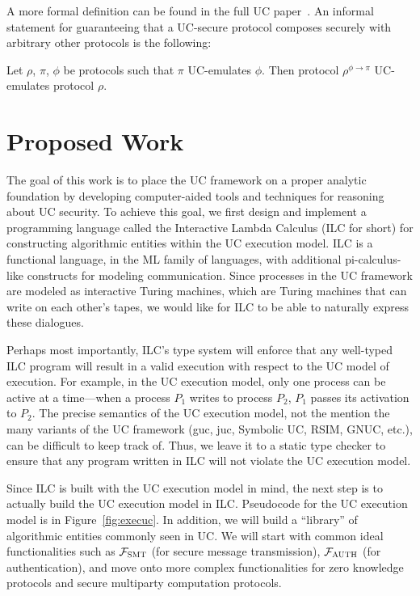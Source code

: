 \documentclass{llncs}
\begin{document}
A more formal definition can be found in the full UC
paper~\cite{canetti2001universally}. An informal statement for guaranteeing that
a UC-secure protocol composes securely with arbitrary other protocols is the following:

\begin{theorem}
Let $\rho$, $\pi$, $\phi$ be protocols such that $\pi$ UC-emulates $\phi$. Then
protocol $\rho^{\phi \rightarrow \pi}$ UC-emulates protocol $\rho$.
\end{theorem}

\section{Proposed Work}

The goal of this work is to place the UC framework on a proper analytic
foundation by developing computer-aided tools and techniques for reasoning about
UC security. To achieve this goal, we first design and implement a programming
language called the Interactive Lambda Calculus (ILC for short) for constructing
algorithmic entities within the UC execution model. ILC is a functional
language, in the ML family of languages, with additional pi-calculus-like
constructs for modeling communication. Since processes in the UC framework are
modeled as interactive Turing machines, which are Turing machines that can write
on each other's tapes, we would like for ILC to be able to naturally express
these dialogues.

Perhaps most importantly, ILC's type system will enforce that any well-typed ILC
program will result in a valid execution with respect to the UC model of
execution. For example, in the UC execution model, only one process can be
active at a time---when a process $P_1$ writes to process $P_2$, $P_1$ passes its
activation to $P_2$. The precise semantics of the UC execution model, not the
mention the many variants of the UC framework (guc, juc, Symbolic UC, RSIM,
GNUC, etc.), can be difficult to keep track of. Thus, we leave it to a static
type checker to ensure that any program written in ILC will not violate the UC
execution model.

Since ILC is built with the UC execution model in mind, the next step is to
actually build the UC execution model in ILC. Pseudocode for the UC execution
model is in Figure~\ref{fig:execuc}. In addition, we will build a ``library'' of
algorithmic entities commonly seen in UC. We will start with common ideal
functionalities such as $\mathcal{F}_{\textsc{SMT}}$ (for secure message
transmission), $\mathcal{F}_{\textsc{AUTH}}$ (for authentication), and move onto
more complex functionalities for zero knowledge protocols and secure multiparty
computation protocols.
\end{document}
